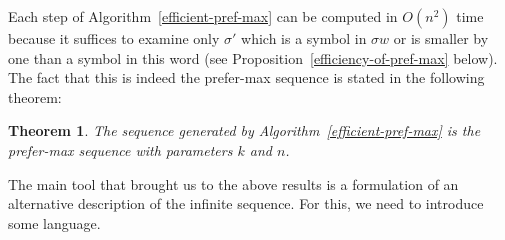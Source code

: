 \documentclass{article}
\newtheorem{theorem}{Theorem}
\theoremstyle{definition}
\begin{document}
Each step of Algorithm~\ref{efficient-pref-max} can be computed in $O(n^2)$ time because it suffices to examine only $\sigma'$ which is a symbol in $\sigma w$ or is smaller by one than a symbol in this word (see Proposition~\ref{efficiency-of-pref-max} below).
The fact that this is indeed the prefer-max sequence is stated in the following theorem:

\begin{theorem}
	The sequence generated by Algorithm~\ref{efficient-pref-max} is the prefer-max sequence with parameters $k$ and $n$.
\end{theorem}
	

The main tool that brought us to the above results is a formulation of an alternative description of the infinite sequence. For this, we need to introduce some language.


	
\end{document}

